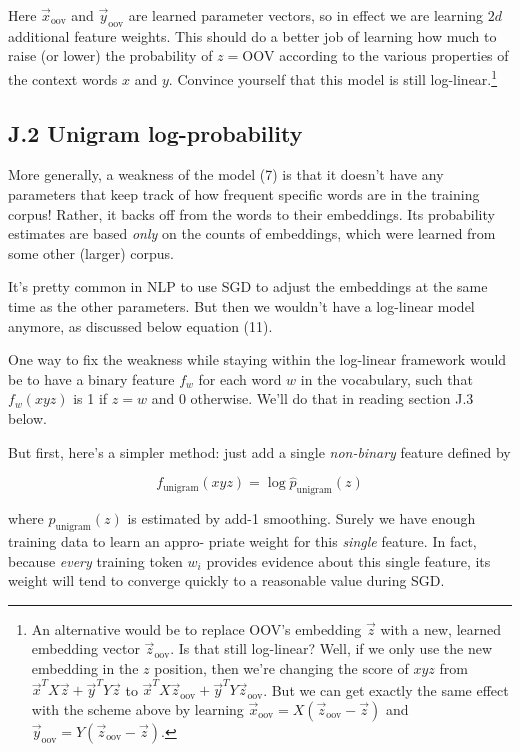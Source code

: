 Here $\vec{x}_{\text{oov}}$ and $\vec{y}_{\text{oov}}$ are learned parameter vectors, so in effect we are learning $2d$ additional feature weights. 
This should do a better job of learning how much to raise (or lower) the probability of $z = \text{OOV}$ according 
to the various properties of the context words $x$ and $y$. Convince yourself that this model is still log-linear.\footnote{An alternative would be to replace OOV’s embedding $\vec{z}$ with a new, learned embedding vector $\vec{z}_{\text{oov}}$. Is that still log-linear? Well, if we only use the new embedding in the $z$ position, then we’re changing the score of $xyz$ from $\vec{x}^TX\vec{z} + \vec{y}^TY\vec{z}$ to $\vec{x}^TX\vec{z}_{\text{oov}} + \vec{y}^TY\vec{z}_{\text{oov}}$. But we can get exactly the same effect with the scheme above by learning $\vec{x}_{\text{oov}} = X(\vec{z}_{\text{oov}} - \vec{z})$ and $\vec{y}_{\text{oov}} = Y(\vec{z}_{\text{oov}} - \vec{z})$.}

\subsection*{J.2 Unigram log-probability}

More generally, a weakness of the model (7) is that it doesn’t have any parameters that keep track of how 
frequent specific words are in the training corpus! Rather, it backs off from the words to their embeddings. 
Its probability estimates are based \emph{only} on the counts of embeddings, which were learned from some other (larger) 
corpus. 

It’s pretty common in NLP to use SGD to adjust the embeddings at the same time as the other parameters. 
But then we wouldn’t have a log-linear model anymore, as discussed below equation (11). 

One way to fix the weakness while staying within the log-linear framework would be to have a binary 
feature $f_w$ for each word $w$ in the vocabulary, such that $f_w(xyz)$ is 1 if $z=w$ and 0 otherwise. We’ll do 
that in reading section J.3 below. 

But first, here’s a simpler method: just add a single \emph{non-binary} feature defined by 

\[
f_{\text{unigram}}(xyz) = \log \hat{p}_{\text{unigram}}(z) \tag{26}
\]

where $\hat{p}_{\text{unigram}}(z)$ is estimated by add-1 smoothing. Surely we have enough training data to learn an appro-
priate weight for this \emph{single} feature. In fact, because \emph{every} training token $w_i$ provides evidence about this 
single feature, its weight will tend to converge quickly to a reasonable value during SGD. 

